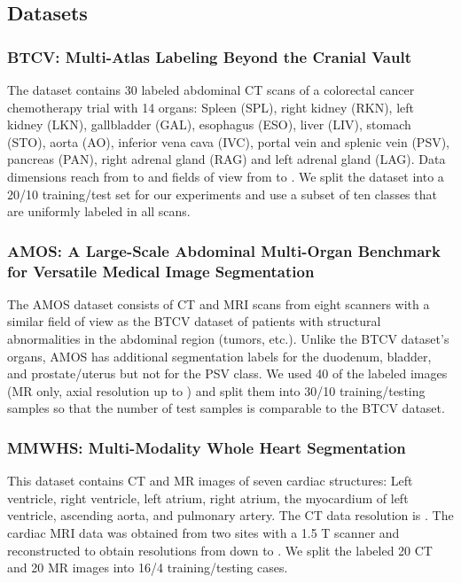     \subsection{Datasets}
        \subsubsection{BTCV: Multi-Atlas Labeling Beyond the Cranial Vault}
        \label{sec:BTCV_dataset}
        The dataset \cite{landman2015miccai} contains 30 labeled abdominal CT scans of a colorectal cancer chemotherapy trial with 14  organs: Spleen (SPL), right kidney (RKN), left kidney (LKN), gallbladder (GAL), esophagus (ESO), liver (LIV), stomach (STO), aorta (AO), inferior vena cava (IVC), portal vein and splenic vein (PSV), pancreas (PAN), right adrenal gland (RAG) and left adrenal gland (LAG).
        Data dimensions reach from  to  and fields of view from  to . We split the dataset into a 20/10 training/test set for our experiments and use a subset of ten classes that are uniformly labeled in all scans.

        \subsubsection{AMOS: A Large-Scale Abdominal Multi-Organ Benchmark
        for Versatile Medical Image Segmentation}
            \label{sec:amos_dataset}
            The AMOS dataset \cite{ji2022amos} consists of CT and MRI scans from eight scanners with a similar field of view as the BTCV dataset of patients with structural abnormalities in the abdominal region (tumors, etc.). Unlike the BTCV dataset's organs, AMOS has additional segmentation labels for the duodenum, bladder, and prostate/uterus but not for the PSV class. We used 40 of the labeled images (MR only, axial resolution  up to ) and split them into 30/10 training/testing samples so that the number of test samples is comparable to the BTCV dataset.


        \subsubsection{MMWHS: Multi-Modality Whole Heart Segmentation}
            \label{sec:MMWHS_dataset}
            This dataset \cite{zhuang2019evaluation} contains CT and MR images of seven cardiac structures: Left ventricle, right ventricle, left atrium, right atrium, the myocardium of left ventricle, ascending aorta, and pulmonary artery.
            The CT data resolution is .
            The cardiac MRI data was obtained from two sites with a 1.5 T scanner and reconstructed to obtain resolutions from  down to .
            We split the labeled 20 CT and 20 MR images into 16/4 training/testing cases.

